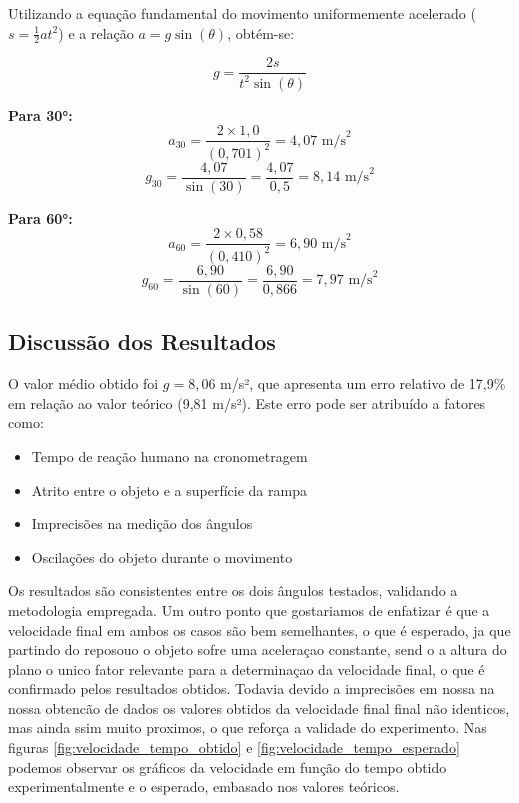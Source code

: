 \documentclass[a4paper, 12pt]{article}
\begin{document}
Utilizando a equação fundamental do movimento uniformemente acelerado ($s = \frac{1}{2}at^2$) e a relação $a = g \sin(\theta)$, obtém-se:

$$g = \frac{2s}{t^2 \sin(\theta)}$$

\textbf{Para 30°:}
$$a_{30} = \frac{2 \times 1,0}{(0,701)^2} = 4,07 \text{ m/s}^2$$
$$g_{30} = \frac{4,07}{\sin(30)} = \frac{4,07}{0,5} = 8,14 \text{ m/s}^2$$

\textbf{Para 60°:}
$$a_{60} = \frac{2 \times 0,58}{(0,410)^2} = 6,90 \text{ m/s}^2$$
$$g_{60} = \frac{6,90}{\sin(60)} = \frac{6,90}{0,866} = 7,97 \text{ m/s}^2$$

\subsection{Discussão dos Resultados}

O valor médio obtido foi $g = 8,06$ m/s², que apresenta um erro relativo de 17,9\% em relação ao valor teórico (9,81 m/s²). Este erro pode ser atribuído a fatores como:
\begin{itemize}
	\item Tempo de reação humano na cronometragem
	\item Atrito entre o objeto e a superfície da rampa
	\item Imprecisões na medição dos ângulos
	\item Oscilações do objeto durante o movimento
\end{itemize}

Os resultados são consistentes entre os dois ângulos testados, validando a metodologia empregada.
Um outro ponto que gostariamos de enfatizar é que a velocidade final em ambos os casos são bem semelhantes, o que é esperado, ja que partindo do reposouo o objeto sofre uma aceleraçao constante, send o a altura do plano o unico fator relevante para a determinaçao da velocidade final, o que é confirmado pelos resultados obtidos.
Todavia devido a imprecisões em nossa na nossa obtencão de dados os valores obtidos da velocidade final final não identicos, mas ainda ssim muito proximos, o que reforça a validade do experimento.
Nas figuras \ref{fig:velocidade_tempo_obtido} e \ref{fig:velocidade_tempo_esperado} podemos observar os gráficos da velocidade em função do tempo obtido experimentalmente e o esperado, embasado nos valores teóricos.
\end{document}
